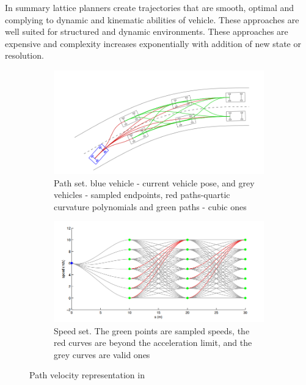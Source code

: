 In summary lattice planners create trajectories that are smooth, optimal and complying to dynamic and kinematic abilities of vehicle. These approaches are well suited for structured and dynamic environments. These approaches are expensive and complexity increases exponentially with addition of new state or resolution. 

\begin{figure}
	\centering
	\begin{subfigure}{.52\textwidth}
		\centering
		\includegraphics[width=1.0\linewidth]{Images/related_work/traj_optim_1.png}
		\caption{Path set. blue vehicle - current vehicle pose, and grey vehicles - sampled endpoints, red paths-quartic curvature polynomials and green paths - cubic ones}
		\label{trajoptsub1}
	\end{subfigure}%
	\begin{subfigure}{.48\textwidth}
		\centering
		\includegraphics[width=1.0\linewidth]{Images/related_work/traj_optim_2.png}
		\caption{Speed set. The green points are sampled speeds, the
red curves are beyond the acceleration limit, and the grey
curves are valid ones}
		\label{trajoptsub2}
	\end{subfigure}
	\caption{Path velocity representation in \cite{traj_planner_optimization}}
	\label{trajopt}
\end{figure}

